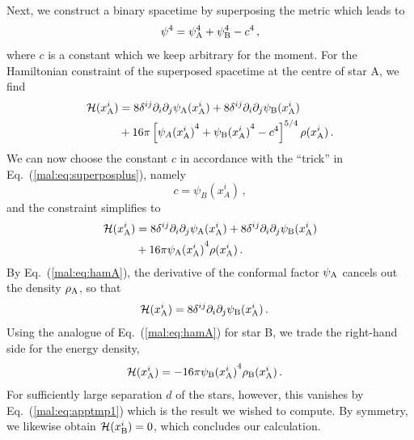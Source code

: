 Next, we construct a binary spacetime by superposing the metric
which leads to
%
\begin{equation}
    \psi^4 = \psi_{\rm A}^4 + \psi_{\rm B}^4-c^4\,,
\end{equation}
%
where $c$ is a constant which we keep arbitrary for the moment.
For the Hamiltonian constraint of the superposed spacetime
at the centre of star A, we find
%
\begin{equation}
\begin{aligned}
    \mathcal{H}(x_{\rm A}^{i}) &=  8 \delta^{ij} \partial_i\partial_j{\psi_{\rm A}({x_{\rm A}^{i}})} + 8 \delta^{ij} \partial_i\partial_j{\psi_{\rm B}({x_{\rm A}^{i}})}\\ &+  16\pi \left[{\psi_{A}({x_{\rm A}^{i}})}^4 + {\psi_{\rm B}({x_{\rm A}^{i}})}^4-c^4\right]^{5/4}\rho(x_{\rm A}^{i})\,.
\end{aligned}
\end{equation}
%
We can now choose the constant $c$ in
accordance with the ``trick'' in Eq.~(\ref{mal:eq:superposplus}),
namely
%
\begin{equation}
   c = \psi_B(x_A^{i})\,,
\end{equation}
%
and the constraint simplifies to
\begin{equation}
\begin{aligned}
    \mathcal{H}(x_{\rm A}^{i}) &=  8 \delta^{ij} \partial_i\partial_j{\psi_{\rm A}({x_{\rm A}^{i}})} + 8 \delta^{ij} \partial_i\partial_j{\psi_{\rm B}({x_{\rm A}^{i}})}\\ &+  16\pi {\psi_{\rm A}({x_{\rm A}^{i}})}^4 \rho(x_{\rm A}^{i})\,.
\end{aligned}
\end{equation}
%
By Eq.~(\ref{mal:eq:hamA}), the derivative of the conformal factor
$\psi_{\rm A}$ cancels out the density $\rho_{\rm A}$,
so that
%
\begin{equation}
\begin{aligned}
    \mathcal{H}(x_{\rm A}^{i}) &=   8 \delta^{ij} \partial_i\partial_j{\psi_{\rm B}({x_{\rm A}^{i}})}\,.
\end{aligned}
\end{equation}
%
Using the analogue of Eq.~(\ref{mal:eq:hamA}) for star B, we trade
the right-hand side for the energy density,
%
\begin{equation}
\begin{aligned}
    \mathcal{H}(x_{\rm A}^{i}) &=   - 16\pi {\psi_{\rm B}({x_{\rm A}^{i}})}^4 \rho_{\rm B}(x_{\rm A}^{i})\,.
\end{aligned}
\end{equation}
%
For sufficiently large separation $d$ of the stars, however,
this vanishes by Eq.~(\ref{mal:eq:apptmp1}) which is the result
we wished to compute. By symmetry, we likewise obtain
$\mathcal{H}(x_{\rm B}^i)=0$, which concludes our calculation.


